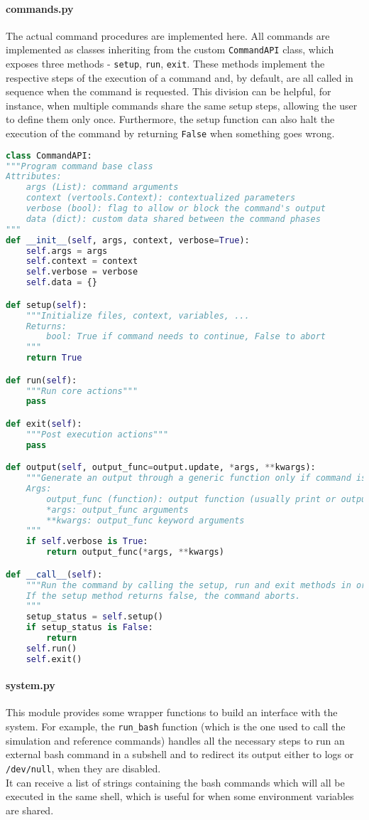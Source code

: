 \paragraph{commands.py} The actual command procedures are implemented here. All commands are implemented as classes inheriting from the custom \texttt{CommandAPI} class, which exposes three methods - \texttt{setup}, \texttt{run}, \texttt{exit}. These methods implement the respective steps of the execution of a command and, by default, are all called in sequence when the command is requested. This division can be helpful, for instance, when multiple commands share the same setup steps, allowing the user to define them only once. Furthermore, the setup function can also halt the execution of the command by returning \texttt{False} when something goes wrong.
\begin{lstlisting}[language=Python]
class CommandAPI:
"""Program command base class
Attributes:
    args (List): command arguments
    context (vertools.Context): contextualized parameters
    verbose (bool): flag to allow or block the command's output
    data (dict): custom data shared between the command phases
"""
def __init__(self, args, context, verbose=True):
    self.args = args
    self.context = context
    self.verbose = verbose
    self.data = {}

def setup(self):
    """Initialize files, context, variables, ...
    Returns:
        bool: True if command needs to continue, False to abort
    """
    return True

def run(self):
    """Run core actions"""
    pass

def exit(self):
    """Post execution actions"""
    pass

def output(self, output_func=output.update, *args, **kwargs):
    """Generate an output through a generic function only if command is set to verbose
    Args:
        output_func (function): output function (usually print or output.update)
        *args: output_func arguments
        **kwargs: output_func keyword arguments
    """
    if self.verbose is True:
        return output_func(*args, **kwargs)

def __call__(self):
    """Run the command by calling the setup, run and exit methods in order.
    If the setup method returns false, the command aborts.
    """
    setup_status = self.setup()
    if setup_status is False:
        return
    self.run()
    self.exit()
\end{lstlisting}

\paragraph{system.py} This module provides some wrapper functions to build an interface with the system. For example, the \texttt{run\_bash} function (which is the one used to call the simulation and reference commands) handles all the necessary steps to run an external bash command in a subshell and to redirect its output either to logs or \texttt{/dev/null}, when they are disabled.\\
It can receive a list of strings containing the bash commands which will all be executed in the same shell, which is useful for when some environment variables are shared.

